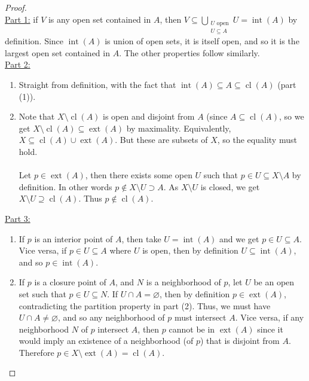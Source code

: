\documentclass{treatise}
\begin{document}
\begin{proof} \ \\
\underline{Part 1:} if $V$ is any open set contained in $A$, then $V \subseteq \bigcup_{\substack{U \text{ open} \\ U \subseteq A}} U = \operatorname{int}(A)$ by definition. Since $\operatorname{int}(A)$ is union of open sets, it is itself open, and so it is the largest open set contained in $A$. The other properties follow similarly.
\\
\underline{Part 2:}
\begin{enumerate}[label=(\alph*)]
    \item Straight from definition, with the fact that $\operatorname{int}(A) \subseteq A \subseteq \operatorname{cl}(A)$ (part (1)).
    \item Note that $X \setminus \operatorname{cl}(A)$ is open and disjoint from $A$ (since $A \subseteq \operatorname{cl}(A)$, so we get $X \setminus \operatorname{cl}(A) \subseteq \operatorname{ext}(A)$ by maximality. Equivalently, $X \subseteq \operatorname{cl}(A) \cup \operatorname{ext}(A)$. But these are subsets of $X$, so the equality must hold.
    \\
    \\
    Let $p \in \operatorname{ext}(A)$, then there exists some open $U$ such that $p \in U \subseteq X \setminus A$ by definition. In other words $p \notin X \setminus U \supset A$. As $X \setminus U$ is closed, we get $X \setminus U \supseteq \operatorname{cl}(A)$. Thus $p \notin \operatorname{cl}(A)$.
\end{enumerate}
\underline{Part 3:}
\begin{enumerate}[label=(\alph*)]
    \item If $p$ is an interior point of $A$, then take $U = \operatorname{int}(A)$ and we get $p \in U \subseteq A$. Vice versa, if $p \in U \subseteq A$ where $U$ is open, then by definition $U \subseteq \operatorname{int}(A)$, and so $p \in \operatorname{int}(A)$.
    \item If $p$ is a closure point of $A$, and $N$ is a neighborhood of $p$, let $U$ be an open set such that $p \in U \subseteq N$. If $U \cap A = \varnothing$, then by definition $p \in \operatorname{ext}(A)$, contradicting the partition property in part (2). Thus, we must have $U \cap A \neq \varnothing$, and so any neighborhood of $p$ must intersect $A$. Vice versa, if any neighborhood $N$ of $p$ intersect $A$, then $p$ cannot be in $\operatorname{ext}(A)$ since it would imply an existence of a neighborhood (of $p$) that is disjoint from $A$. Therefore $p \in X \setminus \operatorname{ext}(A) = \operatorname{cl}(A)$.

\end{enumerate}
\end{proof}
\end{document}
